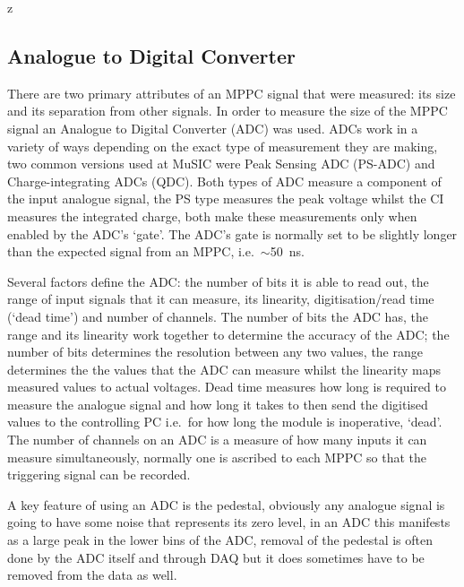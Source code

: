 z
\subsection{Analogue to Digital Converter} %
\label{ssub:analogue_to_digital_converter}
There are two primary attributes of an MPPC signal that were measured: its size and its separation from other signals. In order to measure the size of the MPPC signal an Analogue to Digital Converter (ADC) was used. ADCs work in a variety of ways depending on the exact type of measurement they are making, two common versions used at MuSIC were Peak Sensing ADC (PS-ADC) and Charge-integrating ADCs (QDC). Both types of ADC measure a component of the input analogue signal, the PS type measures the peak voltage whilst the CI measures the integrated charge, both make these measurements only when enabled by the ADC's `gate'. The ADC's gate is normally set to be slightly longer than the expected signal from an MPPC, i.e.\ \( \sim \)50~ns. 

Several factors define the ADC: the number of bits it is able to read out, the range of input signals that it can measure, its linearity, digitisation/read time (`dead time') and number of channels. The number of bits the ADC has, the range and its linearity work together to determine the accuracy of the ADC; the number of bits determines the resolution between any two values, the range determines the the values that the ADC can measure whilst the linearity maps measured values to actual voltages. Dead time measures how long is required to measure the analogue signal and how long it takes to then send the digitised values to the controlling PC i.e.\ for how long the module is inoperative, `dead'. The number of channels on an ADC is a measure of how many inputs it can measure simultaneously, normally one is ascribed to each MPPC so that the triggering signal can be recorded.

A key feature of using an ADC is the pedestal, obviously any analogue signal is going to have some noise that represents its zero level, in an ADC this manifests as a large peak in the lower bins of the ADC, removal of the pedestal is often done by the ADC itself and through DAQ but it does sometimes have to be removed from the data as well.

